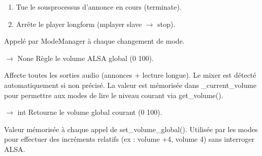 \documentclass[letterpaper,10pt,french]{sphinxmanual}
\begin{document}
\begin{fulllineitems}
\begin{fulllineitems}
\begin{enumerate}
\item {} 
\sphinxAtStartPar
Tue le sous\sphinxhyphen{}processus d’annonce en cours (terminate).

\item {} 
\sphinxAtStartPar
Arrête le player long\sphinxhyphen{}form (mplayer slave \(\rightarrow\) stop).

\end{enumerate}

\sphinxAtStartPar
Appelé par ModeManager à chaque changement de mode.

\end{fulllineitems}


\begin{fulllineitems}
\label{\detokenize{api/core:core.speaker.Speaker.set_volume_global}}
\pysigstartsignatures
\pysiglinewithargsret
{}
{\sphinxparamcomma {}}
{{ $\rightarrow$ None}}
\pysigstopsignatures
\sphinxAtStartPar
Règle le volume ALSA global (0 \textendash{} 100).

\sphinxAtStartPar
Affecte toutes les sorties audio (annonces + lecture longue).
Le mixer est détecté automatiquement si non précisé.
La valeur est mémorisée dans \_current\_volume pour permettre
aux modes de lire le niveau courant via get\_volume().

\end{fulllineitems}


\begin{fulllineitems}
\label{\detokenize{api/core:core.speaker.Speaker.get_volume}}
\pysigstartsignatures
\pysiglinewithargsret
{}
{}
{{ $\rightarrow$ int}}
\pysigstopsignatures
\sphinxAtStartPar
Retourne le volume global courant (0 \textendash{} 100).

\sphinxAtStartPar
Valeur mémorisée à chaque appel de set\_volume\_global().
Utilisée par les modes pour effectuer des incréments relatifs
(ex : volume +4, volume \sphinxhyphen{}4) sans interroger ALSA.


\end{fulllineitems}
\end{fulllineitems}
\end{document}
